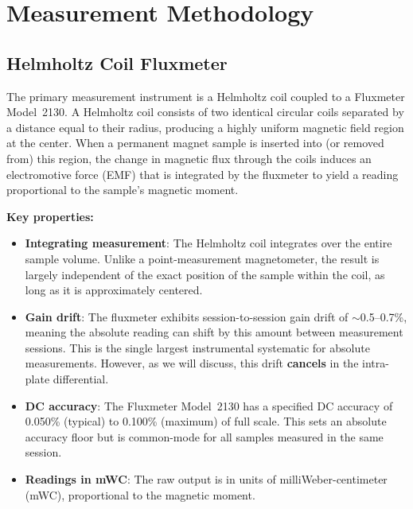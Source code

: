 \documentclass[11pt,letterpaper]{article}
\begin{document}
\section{Measurement Methodology}
\label{sec:measurement}

\subsection{Helmholtz Coil Fluxmeter}

The primary measurement instrument is a Helmholtz coil coupled to a Fluxmeter
Model~2130. A Helmholtz coil consists of two identical circular coils separated
by a distance equal to their radius, producing a highly uniform magnetic field
region at the center. When a permanent magnet sample is inserted into (or
removed from) this region, the change in magnetic flux through the coils
induces an electromotive force (EMF) that is integrated by the fluxmeter to
yield a reading proportional to the sample's magnetic moment.

\textbf{Key properties:}
\begin{itemize}
    \item \textbf{Integrating measurement}: The Helmholtz coil integrates over
    the entire sample volume. Unlike a point-measurement magnetometer, the
    result is largely independent of the exact position of the sample within
    the coil, as long as it is approximately centered.
    \item \textbf{Gain drift}: The fluxmeter exhibits session-to-session gain
    drift of $\sim$0.5--0.7\%, meaning the absolute reading can shift by this
    amount between measurement sessions. This is the single largest
    instrumental systematic for absolute measurements. However, as we will
    discuss, this drift \textbf{cancels} in the intra-plate differential.
    \item \textbf{DC accuracy}: The Fluxmeter Model~2130 has a specified DC
    accuracy of 0.050\% (typical) to 0.100\% (maximum) of full scale. This
    sets an absolute accuracy floor but is common-mode for all samples
    measured in the same session.
    \item \textbf{Readings in mWC}: The raw output is in units of
    milliWeber-centimeter (mWC), proportional to the magnetic moment.
\end{itemize}
\end{document}
